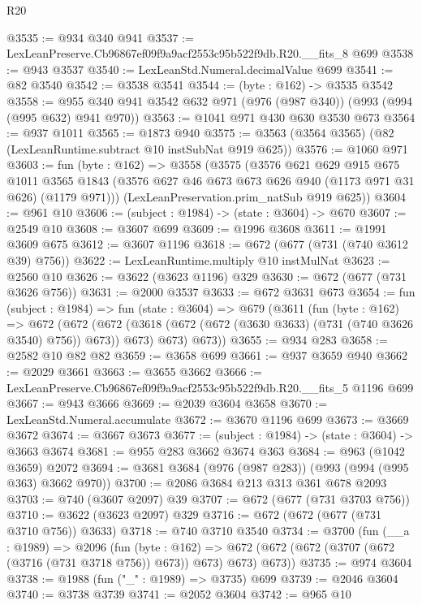 \begin{lexlean}{R20}
\begin{coremodule}
@3535 := @934 @340 @941
@3537 := LexLeanPreserve.Cb96867ef09f9a9acf2553c95b522f9db.R20.__fits_8 @699
@3538 := @943 @3537
@3540 := LexLeanStd.Numeral.decimalValue @699
@3541 := @82 @3540
@3542 := @3538 @3541
@3544 := (byte : @162) -> @3535 @3542
@3558 := @955 @340 @941 @3542 @632 @971 (@976 (@987 @340)) (@993 (@994 (@995 @632) @941 @970))
@3563 := @1041 @971 @430 @630 @3530 @673
@3564 := @937 @1011
@3565 := @1873 @940
@3575 := @3563 (@3564 @3565) (@82 (LexLeanRuntime.subtract @10 instSubNat @919 @625))
@3576 := @1060 @971
@3603 := fun (byte : @162) =>
  @3558
    (@3575
      (@3576
        @621
        @629
        @915
        @675
        @1011
        @3565
        @1843
        (@3576 @627 @46 @673 @673 @626 @940 (@1173 @971 @31 @626) (@1179 @971)))
      (LexLeanPreservation.prim_natSub @919 @625))
@3604 := @961 @10
@3606 := (subject : @1984) -> (state : @3604) -> @670
@3607 := @2549 @10
@3608 := @3607 @699
@3609 := @1996 @3608
@3611 := @1991 @3609 @675
@3612 := @3607 @1196
@3618 := @672 (@677 (@731 (@740 @3612 @39) @756))
@3622 := LexLeanRuntime.multiply @10 instMulNat
@3623 := @2560 @10
@3626 := @3622 (@3623 @1196) @329
@3630 := @672 (@677 (@731 @3626 @756))
@3631 := @2000 @3537
@3633 := @672 @3631 @673
@3654 := fun (subject : @1984) =>
  fun (state : @3604) =>
  @679
    (@3611
      (fun (byte : @162) =>
      @672
        (@672
          (@672 (@3618 (@672 (@672 (@3630 @3633) (@731 (@740 @3626 @3540) @756)) @673)) @673)
          @673)
        @673))
@3655 := @934 @283
@3658 := @2582 @10 @82 @82
@3659 := @3658 @699
@3661 := @937 @3659 @940
@3662 := @2029 @3661
@3663 := @3655 @3662
@3666 := LexLeanPreserve.Cb96867ef09f9a9acf2553c95b522f9db.R20.__fits_5 @1196 @699
@3667 := @943 @3666
@3669 := @2039 @3604 @3658
@3670 := LexLeanStd.Numeral.accumulate
@3672 := @3670 @1196 @699
@3673 := @3669 @3672
@3674 := @3667 @3673
@3677 := (subject : @1984) -> (state : @3604) -> @3663 @3674
@3681 := @955 @283 @3662 @3674 @363
@3684 := @963 (@1042 @3659) @2072
@3694 := @3681 @3684 (@976 (@987 @283)) (@993 (@994 (@995 @363) @3662 @970))
@3700 := @2086 @3684 @213 @313 @361 @678 @2093
@3703 := @740 (@3607 @2097) @39
@3707 := @672 (@677 (@731 @3703 @756))
@3710 := @3622 (@3623 @2097) @329
@3716 := @672 (@672 (@677 (@731 @3710 @756)) @3633)
@3718 := @740 @3710 @3540
@3734 := @3700
    (fun (__a : @1989) =>
    @2096
      (fun (byte : @162) =>
      @672 (@672 (@672 (@3707 (@672 (@3716 (@731 @3718 @756)) @673)) @673) @673) @673))
@3735 := @974 @3604
@3738 := @1988 (fun ("_" : @1989) => @3735) @699
@3739 := @2046 @3604
@3740 := @3738 @3739
@3741 := @2052 @3604
@3742 := @965 @10

\end{coremodule}
\end{lexlean}
